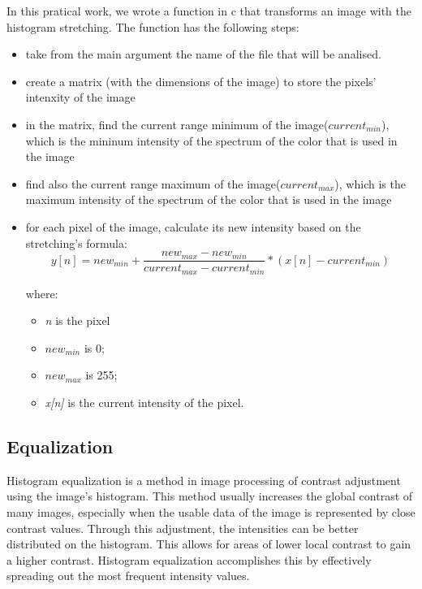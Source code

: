 \documentclass{article}
\begin{document}
	In this pratical work, we wrote a function in c that transforms an image with the histogram stretching. The function has the following steps:
	\begin{itemize}
  		\item take from the main argument the name of the file that will be analised.
  		\item create a matrix (with the dimensions of the image) to store the pixels' intenxity of the image
  		\item in the matrix, find the current range minimum of the image({\it $current_{min}$}), which is the mininum intensity of the spectrum of the color 			that is used in the image
  		\item find also the current range maximum of the image({\it $current_{max}$}), which is the maximum intensity of the spectrum of the color that is 			used in the image
  		\item for each pixel of the image, calculate its new intensity based on the stretching's formula:
		\begin{equation}
			y[n]=new_{min}+\frac{new_{max}-new_{min}}{current_{max}-current_{min}}*(x[n]-current_{min})
			\label{eq:stretching}
		\end{equation}
	
		where: 
			\begin{itemize}
	  			\item {\it n} is the pixel		
	  			\item {\it $new_{min}$} is 0;
	  			\item {\it $new_{max}$} is 255; 
	  			\item {\it x[n]} is the current intensity of the pixel.
			\end{itemize}
	\end{itemize}

	\subsection{Equalization}

	Histogram equalization is a method in image processing of contrast adjustment using the image's histogram. This method usually increases the global contrast 		of many images, especially when the usable data of the image is represented by close contrast values. Through this adjustment, the intensities can be better 		distributed on the histogram. This allows for areas of lower local contrast to gain a higher contrast. Histogram equalization accomplishes this by 		effectively spreading out the most frequent intensity values.
\end{document}
